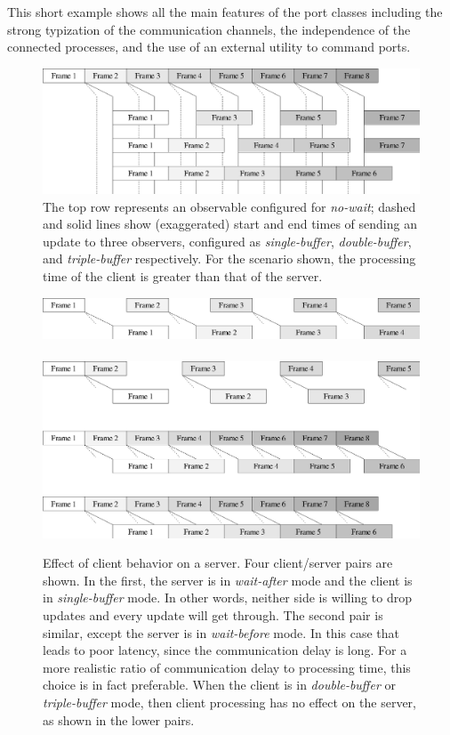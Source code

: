 This short example shows all the main features of the port classes including the strong
typization of the communication channels, the independence of the connected processes, and
the use of an external utility to command ports.



\begin{figure}[t]
\includegraphics[width=\columnwidth]{fig-throughput-nowait}
\caption{
The top row represents an observable configured for \textit{no-wait};
dashed and solid lines show (exaggerated) start and end times of 
sending an update to three observers, configured as
 \textit{single-buffer},
 \textit{double-buffer},
and \textit{triple-buffer}
respectively.  For the scenario shown, the processing time of the
client is greater than that of the server.
}
\label{fig:throughput-nowait}
\end{figure}


\begin{figure}[t]
\includegraphics[width=\columnwidth]{fig-throughput-postwait} \\
\ \\
\includegraphics[width=\columnwidth]{fig-throughput-prewait} 
\caption{ 
%
Effect of client behavior on a server.  Four client/server
pairs are shown. In the first, the server is in \textit{wait-after}
mode and the client is in \textit{single-buffer} mode.  In other
words, neither side is willing to drop updates and every update
will get through.
The second pair is similar, except the server is in \textit{wait-before}
mode.  In this case that leads to poor latency, since the communication
delay is long.  For a more realistic ratio of communication delay to
processing time, this choice is in fact preferable.  When the client
is in \textit{double-buffer} or \textit{triple-buffer} mode, then
client processing has no effect on the server, as shown in the lower
pairs.
%
}
\label{fig:throughput-wait}
\end{figure}

